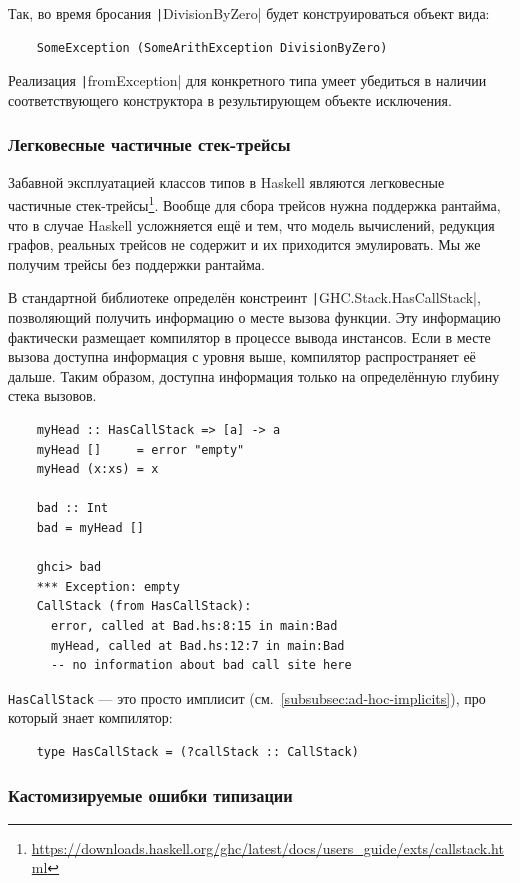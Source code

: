 Так, во время бросания \texttt|DivisionByZero| будет конструироваться объект вида:
\begin{verbatim}
    SomeException (SomeArithException DivisionByZero)
\end{verbatim}
Реализация \texttt|fromException| для конкретного типа умеет убедиться в наличии соответствующего конструктора в результирующем объекте исключения.

\subsubsection{Легковесные частичные стек-трейсы}

Забавной эксплуатацией классов типов в Haskell являются легковесные частичные стек-трейсы\footnote{\url{https://downloads.haskell.org/ghc/latest/docs/users_guide/exts/callstack.html}}.
Вообще для сбора трейсов нужна поддержка рантайма, что в случае Haskell усложняется ещё и тем, что модель вычислений, редукция графов, реальных трейсов не содержит и их приходится эмулировать.
Мы же получим трейсы без поддержки рантайма.

В стандартной библиотеке определён констреинт \texttt|GHC.Stack.HasCallStack|, позволяющий получить информацию о месте вызова функции.
Эту информацию фактически размещает компилятор в процессе вывода инстансов.
Если в месте вызова доступна информация с уровня выше, компилятор распространяет её дальше.
Таким образом, доступна информация только на определённую глубину стека вызовов.
\begin{verbatim}
    myHead :: HasCallStack => [a] -> a
    myHead []     = error "empty"
    myHead (x:xs) = x

    bad :: Int
    bad = myHead []

    ghci> bad
    *** Exception: empty
    CallStack (from HasCallStack):
      error, called at Bad.hs:8:15 in main:Bad
      myHead, called at Bad.hs:12:7 in main:Bad
      -- no information about bad call site here
\end{verbatim}

\texttt{HasCallStack} --- это просто имплисит (см.~\ref{subsubsec:ad-hoc-implicits}), про который знает компилятор:
\begin{verbatim}
    type HasCallStack = (?callStack :: CallStack)
\end{verbatim}

\subsubsection{Кастомизируемые ошибки типизации} \label{subsubsec:custom-type-errors}

